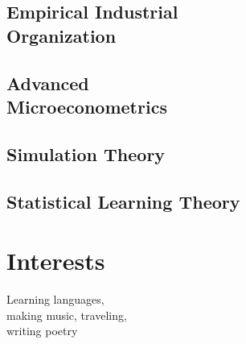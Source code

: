 \documentclass[]{resume}
\begin{document}
\begin{minipage}[t]{0.25\textwidth}
\subsection{Empirical Industrial \\ Organization}
\sectionsep

\subsection{Advanced \\ Microeconometrics}
\sectionsep

\subsection{Simulation Theory}
\sectionsep

\subsection{Statistical Learning Theory}
\sectionsep
\sectionsep


\section{Interests}
Learning languages, \\
making music,
traveling, \\
writing poetry

\end{minipage} 
\end{document}
